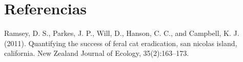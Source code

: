 \documentclass{article}
\begin{document}
\section*{Referencias}

Ramsey, D. S., Parkes, J. P., Will, D., Hanson, C. C., and Campbell, K. J.
(2011). Quantifying the success of feral cat eradication, san nicolas island,
california. New Zealand Journal of Ecology, 35(2):163–173.
\end{document}
